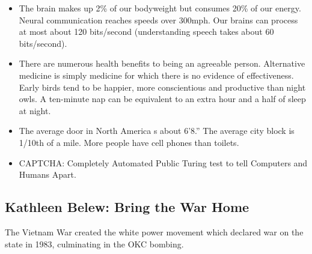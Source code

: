 \documentclass[
]{article}
\begin{document}
\begin{itemize}
\item
  The brain makes up 2\% of our bodyweight but consumes 20\% of our
  energy. Neural communication reaches speeds over 300mph. Our brains
  can process at most about 120 bits/second (understanding speech takes
  about 60 bits/second).
\item
  There are numerous health benefits to being an agreeable person.
  Alternative medicine is simply medicine for which there is no evidence
  of effectiveness. Early birds tend to be happier, more conscientious
  and productive than night owls. A ten-minute nap can be equivalent to
  an extra hour and a half of sleep at night.
\item
  The average door in North America s about 6'8.'' The average city
  block is 1/10th of a mile. More people have cell phones than toilets.
\item
  CAPTCHA: Completely Automated Public Turing test to tell Computers and
  Humans Apart.
\end{itemize}

\hypertarget{kathleen-belew-bring-the-war-home}{%
\subsection{Kathleen Belew: Bring the War
Home}\label{kathleen-belew-bring-the-war-home}}

The Vietnam War created the white power movement which declared war on
the state in 1983, culminating in the OKC bombing.
\end{document}
